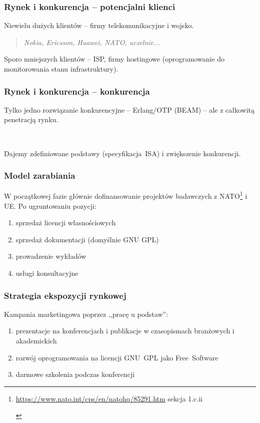 \documentclass{beamer}
\begin{document}
\begin{frame}
    \frametitle{Rynek i konkurencja -- potencjalni klienci}

    Niewielu dużych klientów -- firmy telekomunikacyjne i wojsko.

    \begin{quote}
        \begin{small}
            \emph{Nokia, Ericsson, Huawei, NATO, uczelnie...}
        \end{small}
    \end{quote}

    Sporo mniejszych klientów -- ISP, firmy hostingowe (oprogramowanie do
    monitorowania stanu infrastruktury).
\end{frame}

\begin{frame}
    \frametitle{Rynek i konkurencja -- konkurencja}

    Tylko jedno rozwiązanie konkurencyjne -- Erlang/OTP (BEAM) -- ale z
    całkowitą penetracją rynku.

    ~

    Dajemy zdefiniowane podstawy (specyfikacja~ISA) i zwiększenie konkurencji.
\end{frame}

\begin{frame}
    \frametitle{Model zarabiania}

    W początkowej fazie głównie dofinansowanie projektów badawczych z
    NATO\footnote{\begin{tiny}\url{https://www.nato.int/cps/en/natohq/85291.htm} sekcja 1.c.ii\end{tiny}}
    i UE. Po ugruntowaniu pozycji:

    \begin{enumerate}
        \item sprzedaż licencji własnościowych
        \item sprzedaż dokumentacji (domyślnie GNU GPL)
        \item prowadzenie wykładów
        \item usługi konsultacyjne
    \end{enumerate}
\end{frame}

\begin{frame}
    \frametitle{Strategia ekspozycji rynkowej}

    Kampania marketingowa poprzez ,,pracę u podstaw'':

    \begin{enumerate}
        \item prezentacje na konferencjach i publikacje w czasopismach
            branżowych i akademickich
        \item rozwój oprogramowania na licencji GNU~GPL jako Free~Software
        \item darmowe szkolenia podczas konferencji
    \end{enumerate}
\end{frame}
\end{document}
